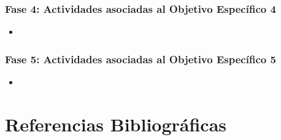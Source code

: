 \documentclass[12pt]{article}
\begin{document}
\subsubsection{Fase 4: Actividades asociadas al Objetivo Específico 4}
\begin{itemize}
    \item 
\end{itemize}

\subsubsection{Fase 5: Actividades asociadas al Objetivo Específico 5}
\begin{itemize}
    \item 
\end{itemize}

\section{Referencias Bibliográficas}
\begin{enumerate}[label={[\arabic*]}]
    \item 
\end{enumerate}
\end{document}
